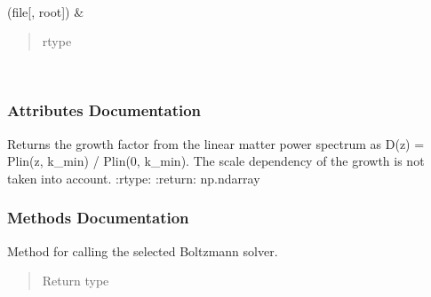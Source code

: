 \documentclass[letterpaper,10pt,english]{sphinxmanual}
\begin{document}
\begin{fulllineitems}
\begin{savenotes}
\begin{longtable}[c]{}
\\
\hline
\sphinxAtStartPar
{\hyperref[\detokenize{api/seyfert.cosmology.power_spectrum.PowerSpectrum:seyfert.cosmology.power_spectrum.PowerSpectrum.saveToHDF5}]{}}(file{[}, root{]})
&
\sphinxAtStartPar
\begin{quote}\begin{description}
\item[{rtype}] \leavevmode
\sphinxAtStartPar
{}

\end{description}\end{quote}

\\
\hline
\end{longtable}\sphinxatlongtableend\end{savenotes}
\subsubsection*{Attributes Documentation}

\begin{fulllineitems}
\label{\detokenize{api/seyfert.cosmology.power_spectrum.PowerSpectrum:seyfert.cosmology.power_spectrum.PowerSpectrum.growth_factor_z}}
\sphinxAtStartPar
Returns the growth factor from the linear matter power spectrum as D(z) = Plin(z, k\_min) / Plin(0, k\_min).
The scale dependency of the growth is not taken into account.
:rtype: 
:return: np.ndarray

\end{fulllineitems}

\subsubsection*{Methods Documentation}

\begin{fulllineitems}
\label{\detokenize{api/seyfert.cosmology.power_spectrum.PowerSpectrum:seyfert.cosmology.power_spectrum.PowerSpectrum.evaluateLinearAndNonLinearPowerSpectra}}
\sphinxAtStartPar
Method for calling the selected Boltzmann solver.
\begin{quote}\begin{description}
\item[{Return type}] \leavevmode
\sphinxAtStartPar
{}


\end{description}
\end{quote}
\end{fulllineitems}
\end{fulllineitems}
\end{document}
